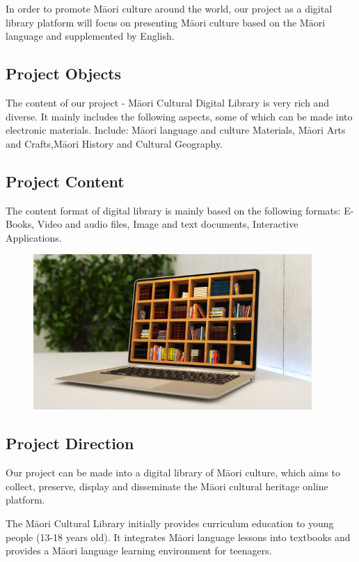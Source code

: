 In order to promote Māori culture around the world, our project as a digital library platform will focus on presenting Māori culture based on the Māori language and supplemented by English.

\subsection{Project Objects}
The content of our project - Māori Cultural Digital Library is very rich and diverse. It mainly includes the following aspects, some of which can be made into electronic materials. Include: Māori language and culture Materials, Māori Arts and Crafts,Māori History and Cultural Geography.

\subsection{Project Content}
The content format of digital library is mainly based on the following formats:
E-Books, Video and audio files, Image and text documents, Interactive Applications.

\begin{figure}[htbp]
  \centerline{\includegraphics[width=300pt]{images/M1-2-1.png}}
\end{figure}

\subsection{Project Direction}
Our project can be made into a digital library of Māori culture, which aims to collect, preserve, display and disseminate the Māori cultural heritage online platform.

The Māori Cultural Library initially provides curriculum education to young people (13-18 years old). It integrates Māori language lessons into textbooks and provides a Māori language learning environment for teenagers.

